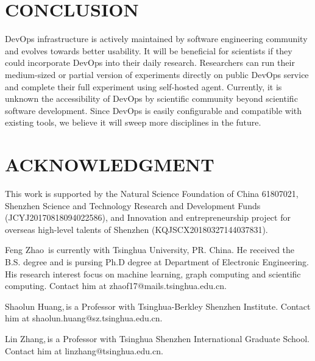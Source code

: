 \documentclass{IEEEcsmag}
\begin{document}

\section{CONCLUSION}
DevOps infrastructure is actively maintained by software engineering community and evolves towards better usability. It will be beneficial for scientists if they could incorporate DevOps into their daily research. Researchers can run their medium-sized or partial version of experiments directly on public DevOps service and complete their full experiment using self-hosted agent. Currently, it is unknown the accessibility of DevOps by scientific community beyond scientific software development. Since DevOps is easily configurable and compatible with existing tools, we believe it will sweep more disciplines in the future.

\section{ACKNOWLEDGMENT}

This work is supported by the Natural Science Foundation of China 61807021, Shenzhen Science and Technology Research and Development Funds (JCYJ20170818094022586), and Innovation and entrepreneurship project for overseas high-level talents of Shenzhen (KQJSCX20180327144037831).







\begin{IEEEbiography}{Feng Zhao}{\,} is
currently with Tsinghua University, PR. China. He received the B.S. degree and is pursing Ph.D degree at Department of Electronic Engineering. His research interest focus on machine learning, graph computing and scientific computing. Contact him at zhaof17@mails.tsinghua.edu.cn.
\end{IEEEbiography}

\begin{IEEEbiography}{Shaolun Huang,}{\,}is a Professor with Tsinghua-Berkley Shenzhen Institute. Contact him at shaolun.huang@sz.tsinghua.edu.cn.
\end{IEEEbiography}

\begin{IEEEbiography}{Lin Zhang,}{\,}is a Professor with Tsinghua Shenzhen International Graduate School. Contact him at linzhang@tsinghua.edu.cn.
\end{IEEEbiography}
\end{document}
